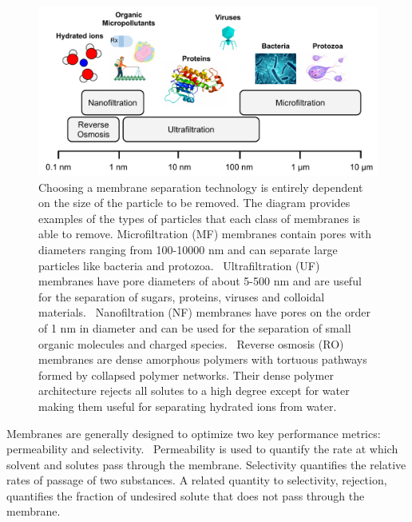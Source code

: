   \begin{figure}
  \centering
  \includegraphics[width=\textwidth]{figs/membrane_separation_size_regimes.pdf}
  \caption{Choosing a membrane separation technology is entirely dependent on the
  size of the particle to be removed. The diagram provides examples of the types 
  of particles that each class of membranes is able to remove. Microfiltration (MF) 
  membranes contain pores with diameters ranging from 100-10000 nm and can separate
  large particles like bacteria and protozoa.~\cite{ma_functionalized_2014}
  Ultrafiltration (UF) membranes have pore diameters of about 5-500 nm and are 
  useful for the separation of sugars, proteins, viruses and colloidal 
  materials.~\cite{yanful_ultrafiltration_2009} Nanofiltration (NF) membranes have
  pores on the order of 1 nm in diameter and can be used for the separation of 
  small organic molecules and charged species.~\cite{van_der_bruggen_review_2003}
  Reverse osmosis (RO) membranes are dense amorphous polymers with tortuous 
  pathways formed by collapsed polymer networks. Their dense polymer architecture 
  rejects all solutes to a high degree except for water making them useful for 
  separating hydrated ions from water.~\cite{warsinger_review_2018}
  }\label{fig:size_regimes}
  \end{figure}
  
  Membranes are generally designed to optimize two key performance metrics: 
  permeability and selectivity.~\cite{geise_water_2011} Permeability is used to
  quantify the rate at which solvent and solutes pass through the membrane.
  Selectivity quantifies the relative rates of passage of two substances.
  A related quantity to selectivity, rejection, quantifies the fraction
  of undesired solute that does not pass through the membrane.
   

